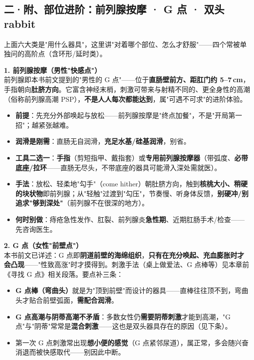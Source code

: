 \documentclass[12pt,UTF8,openany]{ctexbook}
\begin{document}
\subsection*{二·附、部位进阶：前列腺按摩 · G 点 · 双头 rabbit}

上面六大类是"用什么器具"，这里讲"对着哪个部位、怎么才舒服"——四个常被单独问的高阶点（含环形/延时类）。

\textbf{1. 前列腺按摩（男性"快感点"）}\\
前列腺即本书前文提到的"男性的 G 点"——位于\textbf{直肠壁前方、距肛门约 5--7\,cm}，手指朝向\textbf{肚脐方向}。它富含神经末梢，刺激可带来与射精不同的、更全身性的高潮（俗称前列腺高潮 PSP），\textbf{不是人人每次都能达到}，属"可遇不可求"的进阶体验。
\begin{itemize}[leftmargin=2em,itemsep=0.2em]
  \item \textbf{前提}：先充分外部唤起与放松——前列腺按摩是"终点加餐"，不是"开局第一招"；越紧张越难。
  \item \textbf{润滑是刚需}：直肠无自润滑，\textbf{充足水基/硅基润滑}，别省。
  \item \textbf{工具二选一}：\textbf{手指}（剪短指甲、戴指套）或\textbf{专用前列腺按摩器}（带弧度、\textbf{必带底座/拉环}——直肠无尽头，不带底座的器具可能滑入深处需就医）。
  \item \textbf{手法}：放松、轻柔地"勾手"（come hither）朝肚脐方向，触到\textbf{核桃大小、稍硬的块状物}即前列腺；从"轻触"过渡到"勾压"，节奏慢、听身体反馈，\textbf{别硬冲/别追求"够到深处"}（前列腺不在很深的地方）。
  \item \textbf{何时别做}：痔疮急性发作、肛裂、前列腺炎\textbf{急性期}、近期肛肠手术/检查——先咨询医生。
\end{itemize}

\textbf{2. G 点（女性"前壁点"）}\\
本书前文已详述：G 点即\textbf{阴道前壁的海绵组织}，\textbf{只有在充分唤起、充血膨胀时才会凸现}——"性致高涨"时才摸得到。刺激手法（桌上做爱法、G 点棒等）见本章前《寻找 G 点》相关段落。要点补三条：
\begin{itemize}[leftmargin=2em,itemsep=0.2em]
  \item \textbf{G 点棒（弯曲头）}就是为"顶到前壁"而设计的器具——直棒往往顶不到，弯曲头才贴合前壁弧面，\textbf{需配合润滑}。
  \item \textbf{G 点高潮与阴蒂高潮不矛盾}：多数女性仍\textbf{需要阴蒂刺激}才能到高潮，"G 点"与"阴蒂"常常是\textbf{混合刺激}——这也是双头器具存在的原因（见下条）。
  \item 第一次 G 点刺激常出现\textbf{想小便的感觉}（G 点紧邻尿道），属正常，多会随兴奋消退而被快感取代——别因此中断。
\end{itemize}
\end{document}
